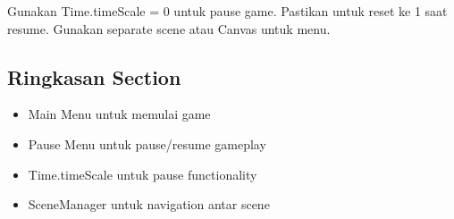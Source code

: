 \begin{catatan}
Gunakan Time.timeScale = 0 untuk pause game. Pastikan untuk reset ke 1 saat resume. Gunakan separate scene atau Canvas untuk menu.
\end{catatan}

\subsection{Ringkasan Section}

\begin{itemize}
\item Main Menu untuk memulai game
\item Pause Menu untuk pause/resume gameplay
\item Time.timeScale untuk pause functionality
\item SceneManager untuk navigation antar scene
\end{itemize}
